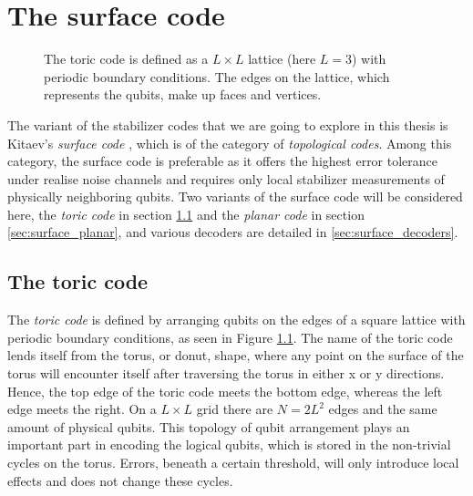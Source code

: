 

\chapter{The surface code}

\begin{figure}[h]
  \centering
  \caption{The toric code is defined as a $L\times L$ lattice (here $L=3$) with periodic boundary conditions. The edges on the lattice, which represents the qubits, make up faces and vertices.}\label{sf:fig_toriclattice}
\end{figure}

The variant of the stabilizer codes that we are going to explore in this thesis is Kitaev's \emph{surface code} \cite{kitaev2003fault}, which is of the category of \emph{topological codes}. Among this category, the surface code is preferable as it offers the highest error tolerance under realise noise channels and requires only local stabilizer measurements of physically neighboring qubits. Two variants of the surface code will be considered here, the \emph{toric code} in section \ref{sec:surface_toric} and the \emph{planar code} in section \ref{sec:surface_planar}, and various decoders are detailed in \ref{sec:surface_decoders}.


\section{The toric code}\label{sec:surface_toric}

The \emph{toric code} is defined by arranging qubits on the edges of a square lattice with periodic boundary conditions, as seen in Figure \ref{sf:fig_toriclattice}. The name of the toric code lends itself from the torus, or donut, shape, where any point on the surface of the torus will encounter itself after traversing the torus in either x or y directions. Hence, the top edge of the toric code meets the bottom edge, whereas the left edge meets the right. On a $L\times L$ grid there are $N = 2L^2$ edges and the same amount of physical qubits. This topology of qubit arrangement plays an important part in encoding the logical qubits, which is stored in the non-trivial cycles on the torus. Errors, beneath a certain threshold, will only introduce local effects and does not change these cycles.


